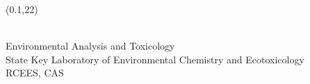 \documentclass[a0,portrait]{a0poster}
\begin{document}
\begin{textblock}{3}(0.1,22)
  \begin{center}
\color{red}\\Environmental Analysis and Toxicology\\State Key Laboratory of Environmental Chemistry and Ecotoxicology\\RCEES, CAS
  \end{center}
\end{textblock}
\end{document}
